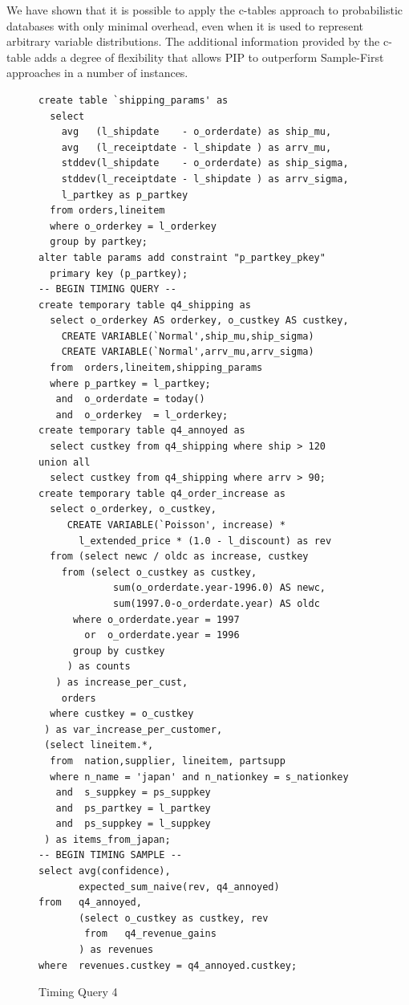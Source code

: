 We have shown that it is possible to apply the c-tables approach to probabilistic databases with only minimal overhead, even when it is used to represent arbitrary variable distributions.  The additional information provided by the c-table adds a degree of flexibility that allows PIP to outperform Sample-First approaches in a number of instances.

\begin{figure}[t!]
\begin{footnotesize}
\begin{verbatim}
create table `shipping_params' as
  select 
    avg   (l_shipdate    - o_orderdate) as ship_mu,
    avg   (l_receiptdate - l_shipdate ) as arrv_mu,
    stddev(l_shipdate    - o_orderdate) as ship_sigma,
    stddev(l_receiptdate - l_shipdate ) as arrv_sigma,
    l_partkey as p_partkey
  from orders,lineitem
  where o_orderkey = l_orderkey
  group by partkey;
alter table params add constraint "p_partkey_pkey" 
  primary key (p_partkey);
-- BEGIN TIMING QUERY --
create temporary table q4_shipping as
  select o_orderkey AS orderkey, o_custkey AS custkey,
    CREATE VARIABLE(`Normal',ship_mu,ship_sigma)
    CREATE VARIABLE(`Normal',arrv_mu,arrv_sigma)
  from  orders,lineitem,shipping_params
  where p_partkey = l_partkey;
   and  o_orderdate = today()
   and  o_orderkey  = l_orderkey;
create temporary table q4_annoyed as
  select custkey from q4_shipping where ship > 120
union all
  select custkey from q4_shipping where arrv > 90;
create temporary table q4_order_increase as
  select o_orderkey, o_custkey,
     CREATE VARIABLE(`Poisson', increase) *
       l_extended_price * (1.0 - l_discount) as rev
  from (select newc / oldc as increase, custkey 
    from (select o_custkey as custkey, 
             sum(o_orderdate.year-1996.0) AS newc,
             sum(1997.0-o_orderdate.year) AS oldc
      where o_orderdate.year = 1997 
        or  o_orderdate.year = 1996
      group by custkey
     ) as counts
   ) as increase_per_cust,
    orders
  where custkey = o_custkey
 ) as var_increase_per_customer,
 (select lineitem.*,
  from  nation,supplier, lineitem, partsupp
  where n_name = 'japan' and n_nationkey = s_nationkey
   and  s_suppkey = ps_suppkey
   and  ps_partkey = l_partkey
   and  ps_suppkey = l_suppkey
 ) as items_from_japan;
-- BEGIN TIMING SAMPLE --
select avg(confidence),
       expected_sum_naive(rev, q4_annoyed)
from   q4_annoyed,
       (select o_custkey as custkey, rev
        from   q4_revenue_gains
       ) as revenues
where  revenues.custkey = q4_annoyed.custkey;
\end{verbatim}
\end{footnotesize}

\vspace{-5mm}

\caption{Timing Query 4}
\label{fig:timingq4}
\end{figure}